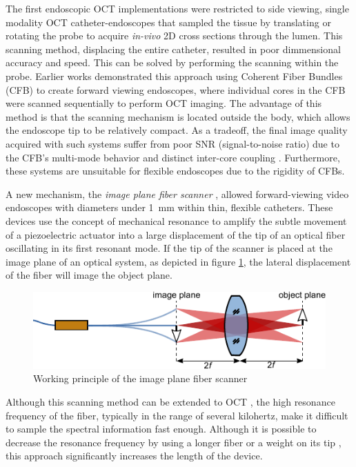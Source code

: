 \documentclass[10pt]{iopart}
\begin{document}
The first endoscopic OCT implementations were restricted to side viewing, single modality OCT catheter-endoscopes that sampled the tissue by translating \cite{Feldchtein1998} or rotating \cite{Tearney1994} \cite{Tearney1996} the probe to acquire \textit{in-vivo} 2D cross sections through the lumen. This scanning method, displacing the entire catheter, resulted in poor dimmensional accuracy and speed. This can be solved by performing the scanning within the probe. Earlier works demonstrated this approach using Coherent Fiber Bundles (CFB) to create forward viewing endoscopes, where individual cores in the CFB were scanned sequentially to perform OCT imaging. The advantage of this method is that the scanning mechanism is located outside the body, which allows the endoscope tip to be relatively compact. As a tradeoff, the final image quality acquired with such systems suffer from poor SNR (signal-to-noise ratio) due to the CFB’s multi-mode behavior and distinct inter-core coupling \cite{Xie2005}. Furthermore, these systems are unsuitable for flexible endoscopes due to the rigidity of CFBs.

A new mechanism, the \textit{image plane fiber scanner} \cite{Seibel2001}, allowed forward-viewing video endoscopes with diameters under \SI{1}{\milli\meter} within thin, flexible catheters. 
These devices use the concept of mechanical resonance to amplify the subtle movement of a piezoelectric actuator into a large displacement of the tip of an optical fiber oscillating in its first resonant mode. If the tip of the scanner is placed at the image plane of an optical system, as depicted in figure \ref{fig:fiberScanner}, the lateral displacement of the fiber will image the object plane. 
\begin{figure}[h!]\centering \includegraphics{figures/fiberScanner.pdf}
      \caption{Working principle of the image plane fiber scanner}
      \label{fig:fiberScanner}
\end{figure}

Although this scanning method can be extended to OCT \cite{Lurie2015}, the high resonance frequency of the fiber, typically in the range of several kilohertz, make it difficult to sample the spectral information fast enough. Although it is possible to decrease the resonance frequency by using a longer fiber or a weight on its tip \cite{Moon2010}, this approach significantly increases the length of the device. 
\end{document}

